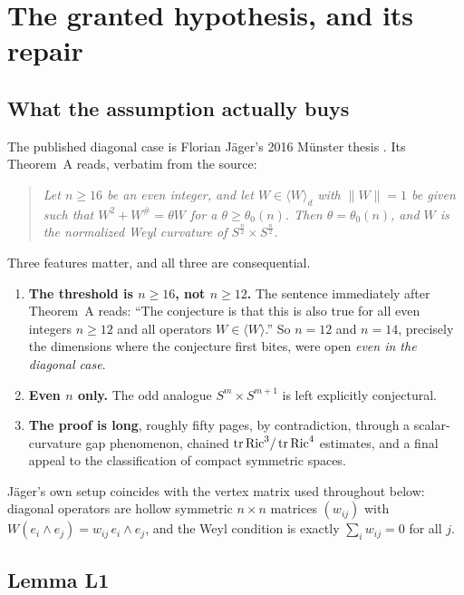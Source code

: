 \section{The granted hypothesis, and its repair}\label{sec:granted}

\subsection{What the assumption actually buys}

The published diagonal case is Florian J\"ager's 2016 M\"unster thesis \cite{jaeger2016}. Its Theorem~A reads, verbatim from the source:

\begin{quote}\itshape
Let $n\ge16$ be an even integer, and let $W\in\langle W\rangle_d$ with $\|W\|=1$ be given such that $W^2+W^{\#}=\theta W$ for a $\theta\ge\theta_0(n)$. Then $\theta=\theta_0(n)$, and $W$ is the normalized Weyl curvature of $S^{\frac n2}\times S^{\frac n2}$.
\end{quote}

Three features matter, and all three are consequential.

\begin{enumerate}[leftmargin=1.6em]
\item \textbf{The threshold is $n\ge16$, not $n\ge12$.} The sentence immediately after Theorem~A reads: ``The conjecture is that this is also true for all even integers $n\ge12$ and all operators $W\in\langle W\rangle$.'' So $n=12$ and $n=14$, precisely the dimensions where the conjecture first bites, were open \emph{even in the diagonal case}.
\item \textbf{Even $n$ only.} The odd analogue $S^m\times S^{m+1}$ is left explicitly conjectural.
\item \textbf{The proof is long}, roughly fifty pages, by contradiction, through a scalar-curvature gap phenomenon, chained $\operatorname{tr}\mathrm{Ric}^3/\operatorname{tr}\mathrm{Ric}^4$ estimates, and a final appeal to the classification of compact symmetric spaces.
\end{enumerate}

J\"ager's own setup coincides with the vertex matrix used throughout below: diagonal operators are hollow symmetric $n\times n$ matrices $(w_{ij})$ with $W(e_i\wedge e_j)=w_{ij}\,e_i\wedge e_j$, and the Weyl condition is exactly $\sum_i w_{ij}=0$ for all $j$.

\subsection{Lemma L1}

